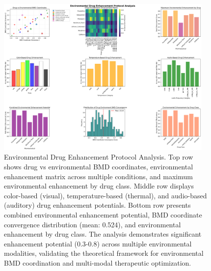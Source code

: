 \begin{figure}[htbp]
\centering
\includegraphics[width=0.95\textwidth]{images/environmental_drug_enhancement_20251004_100843.png}
\caption{Environmental Drug Enhancement Protocol Analysis. Top row shows drug vs environmental BMD coordinates, environmental enhancement matrix across multiple conditions, and maximum environmental enhancement by drug class. Middle row displays color-based (visual), temperature-based (thermal), and audio-based (auditory) drug enhancement potentials. Bottom row presents combined environmental enhancement potential, BMD coordinate convergence distribution (mean: 0.524), and environmental enhancement by drug class. The analysis demonstrates significant enhancement potential (0.3-0.8) across multiple environmental modalities, validating the theoretical framework for environmental BMD coordination and multi-modal therapeutic optimization.}
\label{fig:environmental_enhancement}
\end{figure}

